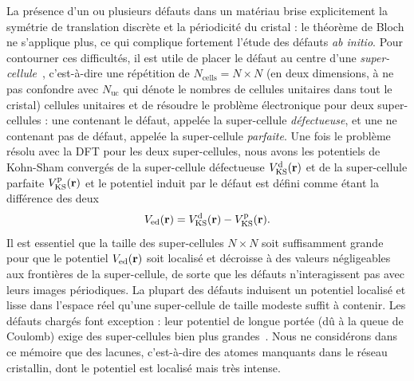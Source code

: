La présence d'un ou plusieurs défauts dans un matériau brise explicitement la symétrie de translation discrète et la périodicité du cristal : le théorème de Bloch ne s'applique plus, ce qui complique fortement l'étude des défauts \textit{ab initio}. Pour contourner ces difficultés, il est utile de placer le défaut au centre d'une \textit{super-cellule}~\cite{freysoldtFirstprinciplesCalculationsPoint2014}, c'est-à-dire une répétition de $N_\text{cells} = N\times N$ (en deux dimensions, à ne pas confondre avec $N_\text{uc}$ qui dénote le nombres de cellules unitaires dans tout le cristal) cellules unitaires et de résoudre le problème électronique pour deux super-cellules : une contenant le défaut, appelée la super-cellule \textit{défectueuse}, et une ne contenant pas de défaut, appelée la super-cellule \textit{parfaite}. Une fois le problème résolu avec la DFT pour les deux super-cellules, nous avons les potentiels de Kohn-Sham convergés de la super-cellule défectueuse $V_\text{KS}^\text{d}(\mathbf{r})$ et de la super-cellule parfaite $V_\text{KS}^\text{p}(\mathbf{r})$ et le potentiel induit par le défaut est défini comme étant la différence des deux
\begin{equation}
    V_\text{ed}(\mathbf{r}) = V_\text{KS}^\text{d}(\mathbf{r}) - V_\text{KS}^\text{p}(\mathbf{r}).\label{eqn:V_ed}
\end{equation}
Il est essentiel que la taille des super-cellules $N\times N$ soit suffisamment grande pour que le potentiel $V_\text{ed}(\mathbf{r})$ soit localisé et décroisse à des valeurs négligeables aux frontières de la super-cellule, de sorte que les défauts n'interagissent pas avec leurs images périodiques. La plupart des défauts induisent un potentiel localisé et lisse dans l'espace réel qu'une super-cellule de taille modeste suffit à contenir. Les défauts chargés font exception : leur potentiel de longue portée (dû à la queue de Coulomb) exige des super-cellules bien plus grandes~\cite{freysoldtFullyInitioFiniteSize2009,luFirstprinciplesIonizedimpurityScattering2021}. Nous ne considérons dans ce mémoire que des lacunes, c'est-à-dire des atomes manquants dans le réseau cristallin, dont le potentiel est localisé mais très intense.

